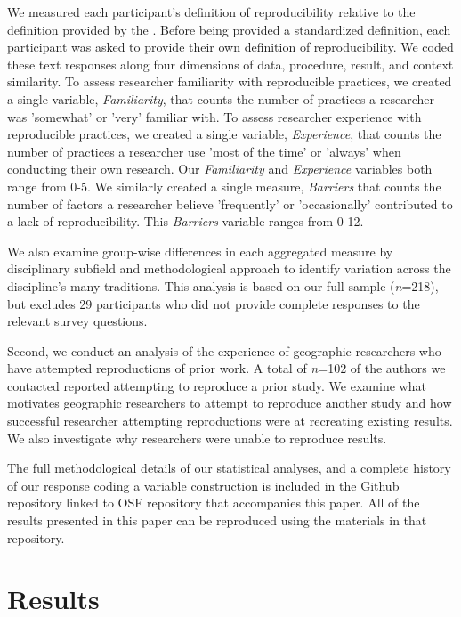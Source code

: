 \documentclass[]{interact}
\theoremstyle{plain}%
\theoremstyle{definition}
\theoremstyle{remark}
\begin{document}
We measured each participant's definition of reproducibility relative to the definition provided by the \citet{NASEM2019}. 
Before being provided a standardized definition, each participant was asked to provide their own definition of reproducibility. 
We coded these text responses along four dimensions of data, procedure, result, and context similarity.  
To assess researcher familiarity with reproducible practices, we created a single variable, \textit{Familiarity}, that counts the number of practices a researcher was 'somewhat' or 'very' familiar with.
To assess researcher experience with reproducible practices, we created a single variable, \textit{Experience}, that counts the number of practices a researcher use 'most of the time' or 'always' when conducting their own research. 
Our \textit{Familiarity} and \textit{Experience} variables both range from 0-5. 
We similarly created a single measure, \textit{Barriers} that counts the number of factors a researcher believe 'frequently' or 'occasionally' contributed to a lack of reproducibility. 
This \textit{Barriers} variable ranges from 0-12.



We also examine group-wise differences in each aggregated measure by disciplinary subfield and methodological approach to identify variation across the discipline's many traditions.
This analysis is based on our full sample (\textit{n}=218), but excludes 29 participants who did not provide complete responses to the relevant survey questions.

Second, we conduct an analysis of the experience of geographic researchers who have attempted reproductions of prior work. 
A total of \textit{n}=102 of the authors we contacted reported attempting to reproduce a prior study. 
We examine what motivates geographic researchers to attempt to reproduce another study and how successful researcher attempting reproductions were at recreating existing results. 
We also investigate why researchers were unable to reproduce results.

The full methodological details of our statistical analyses, and a complete history of our response coding a variable construction is included in the Github repository linked to OSF repository that accompanies this paper.
All of the results presented in this paper can be reproduced using the materials in that repository.

\section*{Results}
\end{document}
